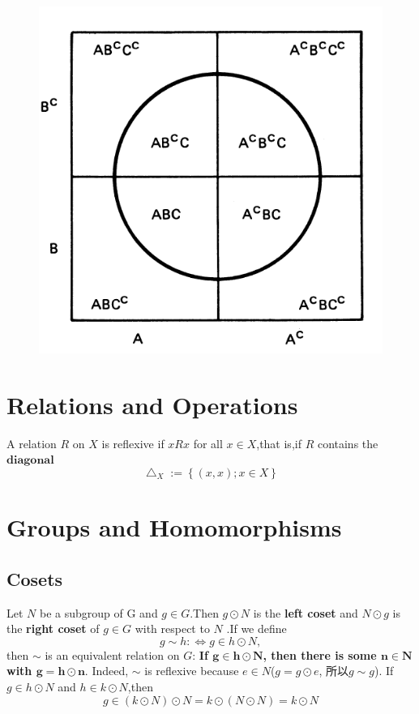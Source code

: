 \documentclass[12pt]{book}
\theoremstyle{definition}\newtheorem{dfn}{Définition}[chapter]
\theoremstyle{plain}\newtheorem{thm}{Théorème}[chapter]
\theoremstyle{plain}\newtheorem{prp}{Proposition}[chapter]
\theoremstyle{plain}\newtheorem{lem}{\bf Lemme}[chapter]
\theoremstyle{plain}\newtheorem{axm}{\bf Axiome}[chapter]
\theoremstyle{plain}\newtheorem{lmm}{\bf Lemme}[chapter]
\theoremstyle{plain}\newtheorem{cor}{\bf Corollaire}[chapter]
\theoremstyle{remark}\newtheorem{rem}{Remarque}[chapter]
\begin{document}
\begin{figure}
\includegraphics[scale=0.5]{image//Probabilite//1}
\end{figure}


\chapter{Relations and Operations}
A relation $R$ on $X$ is reflexive if $xRx$ for all $x\in X$,that is,if $R$ contains the $\mathbf{diagonal}$
$$
\bigtriangleup_{X} :=\left \{ (x,x);x\in X \right \}
$$




\chapter{Groups and Homomorphisms}
\section{Cosets}
Let $N$ be a subgroup of G
and $g\in G$.Then $g\odot N$ is the \textbf{left coset} and $N\odot g$ is the \textbf{right coset} of $g\in G$ with respect to $N$ .If we define
$$
g\sim h:\Longleftrightarrow g\in h\odot N
,$$
then $\sim$ is an equivalent relation on $G$:
\textbf{If $\mathbf{g\in h\odot N}$, then there is some $\mathbf{n\in N}$ with $\mathbf{g=h\odot n}$}. Indeed, $\sim$ is reflexive because $e\in N$($g=g\odot e$, 所以$g\sim g$). If $g\in h\odot N$ and $h\in k\odot N$,then
$$
g\in (k\odot N)\odot N=k\odot (N\odot N)=k\odot N
$$
\end{document}
